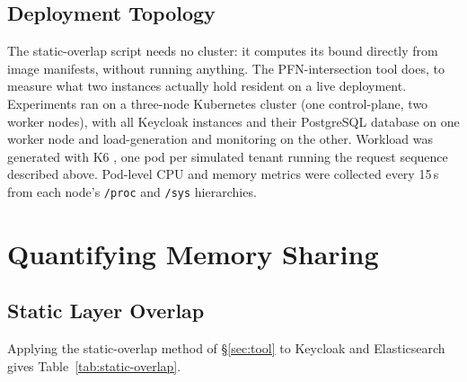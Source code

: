 \documentclass[sigplan,10pt,natbib=false]{acmart}
\begin{document}
\subsection{Deployment Topology}
\label{sec:topology}

The static-overlap script needs no cluster: it computes its bound
directly from image manifests, without running anything. The
PFN-intersection tool does, to measure what two instances actually
hold resident on a live deployment. Experiments ran on a three-node Kubernetes cluster (one control-plane,
two worker nodes), with all Keycloak instances and their PostgreSQL
database on one worker node and load-generation and monitoring on the
other. Workload was generated with K6 \cite{k6}, one pod per simulated
tenant running the request sequence described above. Pod-level CPU and
memory metrics were collected every 15\,s from each node's
\texttt{/proc} and \texttt{/sys} hierarchies.

\section{Quantifying Memory Sharing}
\label{sec:results}

\subsection{Static Layer Overlap}
\label{sec:static-overlap}

Applying the static-overlap method of \S\ref{sec:tool} to Keycloak and
Elasticsearch gives Table~\ref{tab:static-overlap}.
\end{document}
